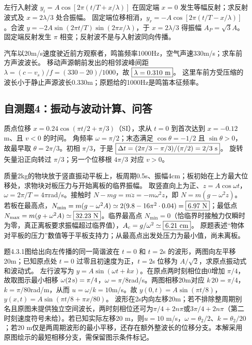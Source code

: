 \problemtext 左行入射波 $y_i=A\cos[2\pi(t/T+x/\lambda)]$ 在固定端 $x=0$ 发生等幅反射；求反射波式及 $x=2\lambda/3$ 处合振幅。
\workings 固定端位移相消，$\boxed{y_r=-A\cos[2\pi(t/T-x/\lambda)]}$。合波 $y=-2A\sin(2\pi t/T)\sin(2\pi x/\lambda)$，于 $x=2\lambda/3$ 得振幅 $\boxed{A_P=\sqrt3 A}$。
\crosscheck 固定端反射发生 $\pi$ 相变；反射波不是与入射波同向传播。

\problemtext 汽车以20m/s速度驶近前方观察者，鸣笛频率1000Hz，空气声速330m/s；求车前方声波波长。
\workings 移动声源朝前发出的相邻波峰间距 $\lambda=(c-v_s)/f=(330-20)/1000$，故 $\boxed{\lambda=0.310\ {\rm m}}$。
\crosscheck 这里车前方受压缩的波长小于静止声源波长0.330m；原题给的1000Hz是鸣笛本征频率。

\subsection{自测题4：振动与波动计算、问答}

\problemtext 质点位移 $x=0.24\cos(\pi t/2+\pi/3)$（SI），求从 $t=0$ 到首次达到 $x=-0.12$m、且 $v<0$ 的时间。
\workings 角频率 $\omega=\pi/2$；末态满足 $\cos\theta=-1/2$ 且 $\sin\theta>0$，故最早取 $\theta=2\pi/3$。初相 $\pi/3$，于是 $\boxed{\Delta t=(2\pi/3-\pi/3)/(\pi/2)=2/3\ {\rm s}}$。
\crosscheck 旋转矢量沿正向转过 $\pi/3$；另一个位移根 $4\pi/3$ 对应 $v>0$。

\problemtext 质量2kg的物块放于竖直振动平板上，板周期0.5s、振幅4cm；板初始在上方最大位移处，求物块对板压力与开始离板的临界振幅。
\workings 取竖直向上为正、$z=A\cos\omega t$，$\omega=2\pi/T=4\pi$rad/s。接触时 $N-mg=m\ddot z=-m\omega^2 z$，即 $N=m(g-\omega^2 z)$。若板在最高点，$N_{\min}=m(g-\omega^2A)\simeq2(9.8-16\pi^2\cdot0.04)=\boxed{6.97\ {\rm N}}$；最低点 $N_{\max}=m(g+\omega^2A)\simeq\boxed{32.23\ {\rm N}}$。临界最高点 $N_{\min}=0$（恰临界时接触力仅瞬时为零，真正离板要求振幅超过临界值），$A_c=g/\omega^2\simeq\boxed{6.21\ {\rm cm}}$。
\crosscheck 原题表述“物体对平板的压力”数值等于平板支持力；从最高点出发处压力为最小值，尚未离板。

\problemtext 题4.3.1图给出向左传播的同一简谐波在 $t=0$ 和 $t=2$s 的波形，两图向左平移20m；已知原点处 $t=0$ 过零且初速度为正，$t=2$s 位移为 $A/\sqrt2$，求原点振动式和波动式。
\workings 左行波写为 $y=A\sin(\omega t+kx)$。在原点两时刻相位由0增加 $\pi/4$，故取图示最小相移 $\omega(2\,{\rm s})=\pi/4$，$\omega=\pi/8$rad/s。两图相移20m对应 $k\,20=\pi/4$，$k=\pi/80$rad/m，从而 $u=\omega/k=10$m/s。故 $\boxed{y(0,t)=A\sin(\pi t/8)}$，$\boxed{y(x,t)=A\sin(\pi t/8+\pi x/80)}$。
\crosscheck 波形在2s内向左移20m；若不排除整周期别名且原图未提供独立空间波长，两时刻相位还可为$\pi/4+2n\pi$或$3\pi/4+2n\pi$（第二时刻速度符号未给）。若已知实际左移20 m，则$u=10$ m/s，$\omega=\theta_2/2$、$k=\theta_2/20$；若20 m仅是两周期波形的最小平移，还存在额外整波长的位移分支。本解采用原图绘示的最短相移分支，需保留图示条件标记。

